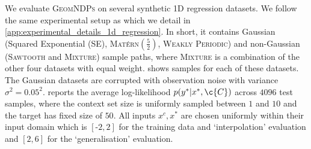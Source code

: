 We evaluate {\scshape GeomNDPs} on several synthetic 1D regression datasets.
We follow the same experimental setup as \textcite{bruinsma2020Gaussian} which we detail in \cref{app:experimental_details_1d_regression}.
In short, it contains Gaussian (Squared Exponential ({\scshape SE}), {\scshape Mat\'ern\((\tfrac52)\)}, {\scshape Weakly Periodic}) and non-Gaussian ({\scshape Sawtooth} and {\scshape Mixture}) sample paths, where {\scshape Mixture} is a combination of the other four datasets with equal weight.
 shows samples for each of these datasets.
The Gaussian datasets are corrupted with observation noise with variance \(\sigma^2=0.05^2\).
 reports the average log-likelihood \(p(y^* | x^*, \c{C})\) across \(4096\) test samples, where the context set size is uniformly sampled between \(1\) and \(10\) and the target has fixed size of \(50\).
All inputs \(x^c, x^*\) are chosen uniformly within their input domain which is \([\text{-}2, 2]\) for the training data and {`interpolation'} evaluation and \([2, 6]\) for the {`generalisation'} evaluation.


